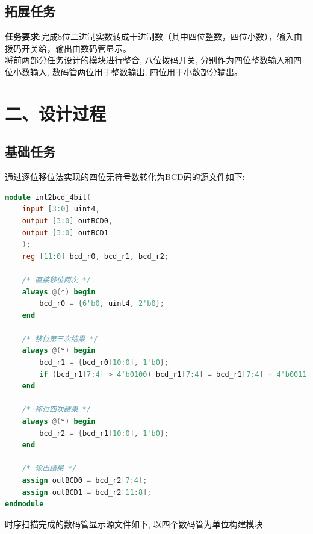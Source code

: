 \documentclass{article}
\newcommand{\fourhao}{\fontsize{14pt}{\baselineskip}\selectfont} %
\newcommand{\xiaosihao}{\fontsize{12pt}{\baselineskip}\selectfont} %
\begin{document}
\subsection*{拓展任务}
\textbf{任务要求}:完成8位二进制实数转成十进制数（其中四位整数，四位小数），输入由拨码开关给，输出由数码管显示。\\
将前两部分任务设计的模块进行整合, 八位拨码开关, 分别作为四位整数输入和四位小数输入, 数码管两位用于整数输出, 四位用于小数部分输出。
\section*{\fourhao 二、设计过程}
\xiaosihao
{}
\subsection*{基础任务}
通过逐位移位法实现的四位无符号数转化为BCD码的源文件如下:
\begin{lstlisting}[language=Verilog, caption={二进制转BCD}]
module int2bcd_4bit(
    input [3:0] uint4,
    output [3:0] outBCD0,
    output [3:0] outBCD1
    );
    reg [11:0] bcd_r0, bcd_r1, bcd_r2;

    /* 直接移位两次 */
    always @(*) begin
        bcd_r0 = {6'b0, uint4, 2'b0};
    end

    /* 移位第三次结果 */
    always @(*) begin
        bcd_r1 = {bcd_r0[10:0], 1'b0};
        if (bcd_r1[7:4] > 4'b0100) bcd_r1[7:4] = bcd_r1[7:4] + 4'b0011;
    end
    
    /* 移位四次结果 */
    always @(*) begin
        bcd_r2 = {bcd_r1[10:0], 1'b0};
    end
    
    /* 输出结果 */
    assign outBCD0 = bcd_r2[7:4];
    assign outBCD1 = bcd_r2[11:8];
endmodule
\end{lstlisting}
时序扫描完成的数码管显示源文件如下, 以四个数码管为单位构建模块:
\end{document}
